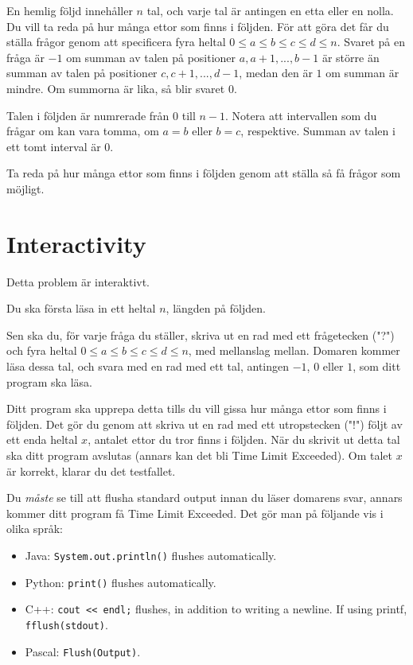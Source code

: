 En hemlig följd innehåller $n$ tal, och varje tal är antingen en etta eller en nolla. Du vill ta reda på hur många
ettor som finns i följden. För att göra det får du ställa frågor genom att specificera fyra heltal
$0 \leq a \leq b \leq c \leq d \leq n$. Svaret på en fråga är $-1$ om summan av talen på positioner $a, a+1, ..., b-1$ är större
än summan av talen på positioner $c, c+1, ..., d-1$, medan den är $1$ om summan är mindre. Om summorna är lika, så blir svaret $0$.

Talen i följden är numrerade från $0$ till $n-1$. Notera att intervallen som du frågar om kan vara tomma, om $a = b$
eller $b = c$, respektive. Summan av talen i ett tomt interval är $0$.

Ta reda på hur många ettor som finns i följden genom att ställa så få frågor som möjligt.

\section*{Interactivity}
Detta problem är interaktivt.

Du ska första läsa in ett heltal $n$, längden på följden.

Sen ska du, för varje fråga du ställer, skriva ut en rad med ett frågetecken ("?") och fyra heltal
$0 \leq a \leq b \leq c \leq d \leq n$, med mellanslag mellan. Domaren kommer läsa dessa tal,
och svara med en rad med ett tal, antingen $-1$, $0$ eller $1$, som ditt program ska läsa.

Ditt program ska upprepa detta tills du vill gissa hur många ettor som finns i följden. Det gör
du genom att skriva ut en rad med ett utropstecken ("!") följt av ett enda heltal $x$, antalet ettor
du tror finns i följden. När du skrivit ut detta tal ska ditt program avslutas (annars kan det bli
Time Limit Exceeded). Om talet $x$ är korrekt, klarar du det testfallet.

Du \emph{måste} se till att flusha standard output innan du läser domarens svar, annars kommer ditt program
få Time Limit Exceeded. Det gör man på följande vis i olika språk:
\begin{itemize}
  \item Java: \texttt{System.out.println()} flushes automatically.
  \item Python: \texttt{print()} flushes automatically.
  \item C++: \texttt{cout << endl;} flushes, in addition to writing a newline. If using printf, \texttt{fflush(stdout)}.
  \item Pascal: \texttt{Flush(Output)}.
\end{itemize}

